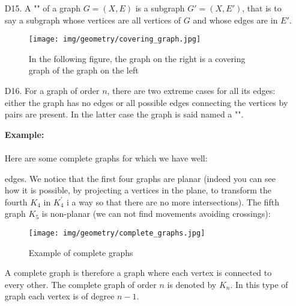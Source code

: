 {\begin{enumerate}
	\begin{figure}[H]
		\centering
		\texttt{[image: img/geometry/subgraph\_inducedsubgraph.jpg]}
		\caption{Left is a subgraph, right is an induced graph}
	\end{figure}
	
	\item[D15.] A "" of a graph $G=(X,E)$ is a subgraph $G'=(X,E')$, that is to say a subgraph whose vertices are all vertices of $G$ and whose edges are in $E'$.
	
	\begin{figure}[H]
		\centering
		\texttt{[image: img/geometry/covering\_graph.jpg]}
		\caption[]{In the following figure, the graph on the right is a covering graph of the graph on the left}
	\end{figure}
	
	\item[D16.] For a graph of order $n$, there are two extreme cases for all its edges: either the graph has no edges or all possible edges connecting the vertices by pairs are present. In the latter case the graph is said named a "".
	\begin{tcolorbox}[colframe=black,colback=white,sharp corners]
	\textbf{{\Large {}}Example:}\\\\
	Here are some complete graphs for which we have well:
	
	edges. We notice that the first four graphs are planar (indeed you can see how it is possible, by projecting a vertices in the plane, to transform the fourth $K_4$ in $K_4^{'}$ i a way so that there are no more intersections). The fifth graph $K_5$ is non-planar (we can not find movements avoiding crossings):
	\begin{figure}[H]
		\centering
		\texttt{[image: img/geometry/complete\_graphs.jpg]}
		\caption{Example of complete graphs}
	\end{figure}
	A complete graph is therefore a graph where each vertex is connected to every other. The complete graph of order $n$ is denoted by $K_n$. In this type of graph each vertex is of degree $n-1$.
	\end{tcolorbox}
	

\end{enumerate}}

